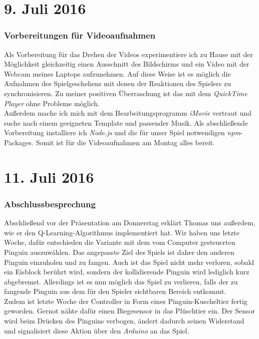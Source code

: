 \documentclass{report}
\begin{document}
\section*{9. Juli 2016}

\subsubsection*{Vorbereitungen für Videoaufnahmen}

Als Vorbereitung für das Drehen der Videos experimentiere ich zu Hause mit der Möglichkeit gleichzeitig einen Ausschnitt des Bildschirms und ein Video mit der Webcam meines Laptops aufzunehmen. Auf diese Weise ist es möglich die Aufnahmen des Spielgeschehens mit denen der Reaktionen des Spielers zu synchronisieren. Zu meiner positiven Überraschung ist das mit dem \textit{QuickTime Player} ohne Probleme möglich. \\

\noindent Außerdem mache ich mich mit dem Bearbeitungsprogramm \textit{iMovie} vertraut und suche nach einem geeigneten Template und passender Musik. Als abschließende Vorbereitung installiere ich \textit{Node.js} und die für unser Spiel notwendigen \textit{npm}-Packages. Somit ist für die Videoaufnahmen am Montag alles bereit.



\section*{11. Juli 2016}

\subsubsection*{Abschlussbesprechung}

Abschließend vor der Präsentation am Donnerstag erklärt Thomas uns außerdem, wie er den Q-Learning-Algorithmus implementiert hat. Wir haben uns letzte Woche, dafür entschieden die Variante mit dem vom Computer gesteuerten Pinguin auszuwählen. Das angepasste Ziel des Spiels ist daher den anderen Pinguin einzuholen und zu fangen. Auch ist das Spiel nicht mehr verloren, sobald ein Eisblock berührt wird, sondern der kollidierende Pinguin wird lediglich kurz abgebremst. Allerdings ist es nun möglich das Spiel zu verlieren, falls der zu fangende Pinguin aus dem für den Spieler sichtbaren Bereich entkommt. \\

Zudem ist letzte Woche der Controller in Form eines Pinguin-Kuscheltier fertig geworden. Gernot nähte dafür einen Biegesensor in das Plüschtier ein. Der Sensor wird beim Drücken des Pinguins verbogen, ändert dadurch seinen Widerstand und signalisiert diese Aktion über den \textit{Arduino} an das Spiel.
\end{document}
